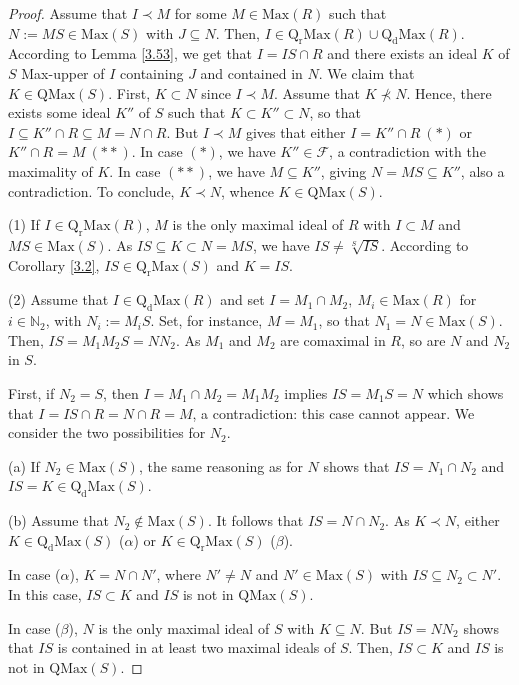 \documentclass[10pt,a4paper]{amsart}
\begin{document}
\begin{proof}   
Assume that $I\prec M$ for some $M\in\mathrm{Max}(R)$ such that $N:=M S\in\mathrm{Max}(S)$ with $J\subseteq N$. Then, $I\in\mathrm{Q_rMax}(R)\cup\mathrm{Q_dMax}(R)$. According to Lemma \ref{3.53}, we get that $I=IS\cap R$ and there exists an ideal $K$ of $S$ Max-upper of $I$ containing $J$ and contained in $N$. We claim that $K\in\mathrm{QMax}(S)$. First, $K\subset N$ since $I\prec M$. Assume that $K\nprec N$. Hence, there exists some ideal $K''$ of $S$ such that $K\subset K''\subset N$, so that $I\subseteq K''\cap R\subseteq M=N\cap R$. But $I\prec M$ gives that either $I=K''\cap R\ (*)$ or $K''\cap R=M\ (**)$. In case $(*)$, we have $K''\in\mathcal F$, a contradiction with the maximality of $K$. In case $(**)$, we have $M\subseteq K''$, giving $N=MS\subseteq K''$, also a contradiction. To conclude, $K\prec N$, whence $K\in\mathrm{QMax}(S)$.

(1) If $I\in\mathrm{Q_rMax}(R)$, $M$ is the only maximal ideal of $R$ with $I\subset M$ and $MS\in\mathrm{Max}(S)$. As $IS\subseteq K\subset N= MS$, we have $IS\neq\sqrt[S]{IS}$. According to Corollary \ref{3.2}, 
 $IS\in\mathrm{Q_rMax}(S)$ and $K=IS$. 

(2) Assume that $I\in\mathrm{Q_dMax}(R)$ and set $I=M_1\cap M_2,\ M_i\in\mathrm{Max}(R)$ for $i\in\mathbb N_2$, with $N_i:=M_iS$. Set, for instance, $M=M_1$, so that $N_1=N\in\mathrm{Max}(S)$. Then, $IS=M_1 M_2S=NN_2$. As $M_1$ and $M_2$ are comaximal in $R$, so are $N$ and $N_2$ in $S$. 

First, if $N_2=S$, then $I=M_1\cap M_2=M_1M_2$ implies $IS =M_1S=N$ which shows that $I=IS\cap R=N\cap R=M$, a contradiction: this case cannot appear. We  consider the two possibilities for $N_2$.

(a) If $N_2\in\mathrm{Max}(S)$, the same reasoning as for $N$ shows that $IS=N_1\cap N_2$ and $IS=K\in\mathrm {Q_dMax}(S)$. 

(b) Assume that $N_2\not\in\mathrm{Max}(S)$. It follows that $IS= N\cap N_2$. As $K\prec N$, either $K\in\mathrm{Q_dMax}(S)$ ($\alpha$) or $K\in\mathrm {Q_rMax}(S)$ ($\beta$). 

In case ($\alpha$), $K=N\cap N'$, where $N'\neq N$ and $N'\in\mathrm {Max}(S)$ with $IS\subseteq N_2\subset N'$. In this case, $IS\subset K$ and $IS$ is not in $\mathrm{QMax}(S)$.

In case ($\beta$), $N$ is the only maximal ideal of $S$ with $K\subseteq N$. But $IS=NN_2$ shows that $IS$ is contained in at least two maximal ideals of $S$. Then, $IS\subset K$ and $IS$ is not in $\mathrm{QMax}(S)$. 
\end{proof}
\end{document}
